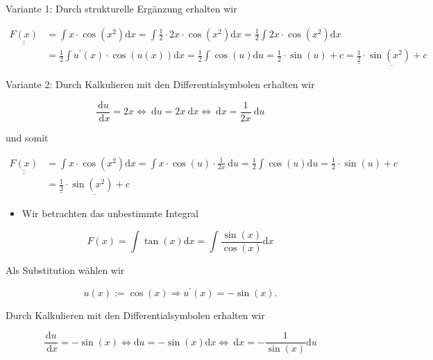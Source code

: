 \documentclass[10pt]{article}
\begin{document}
Variante 1: Durch strukturelle Ergänzung erhalten wir


\begin{align*}
\underline{\underline{F(x)}} & =\int x \cdot \cos \left(x^{2}\right) \mathrm{d} x=\int \frac{1}{2} \cdot 2 x \cdot \cos \left(x^{2}\right) \mathrm{d} x=\frac{1}{2} \int 2 x \cdot \cos \left(x^{2}\right) \mathrm{d} x \\
& =\frac{1}{2} \int u^{\prime}(x) \cdot \cos (u(x)) \mathrm{d} x=\frac{1}{2} \int \cos (u) \mathrm{d} u=\frac{1}{2} \cdot \sin (u)+c=\underline{\underline{\frac{1}{2}} \cdot \sin \left(x^{2}\right)+c} \tag{3.4}
\end{align*}


Variante 2: Durch Kalkulieren mit den Differentialsymbolen erhalten wir


\begin{equation*}
\frac{\mathrm{d} u}{\mathrm{~d} x}=2 x \Leftrightarrow \mathrm{~d} u=2 x \mathrm{~d} x \Leftrightarrow \mathrm{~d} x=\frac{1}{2 x} \mathrm{~d} u \tag{3.5}
\end{equation*}


und somit


\begin{align*}
\underline{\underline{F(x)}} & =\int x \cdot \cos \left(x^{2}\right) \mathrm{d} x=\int x \cdot \cos (u) \cdot \frac{1}{2 x} \mathrm{~d} u=\frac{1}{2} \int \cos (u) \mathrm{d} u=\frac{1}{2} \cdot \sin (u)+c \\
& =\underline{\underline{\frac{1}{2}} \cdot \sin \left(x^{2}\right)+c} \tag{3.6}
\end{align*}


\begin{itemize}
  \item Wir betrachten das unbestimmte Integral
\end{itemize}


\begin{equation*}
F(x)=\int \tan (x) \mathrm{d} x=\int \frac{\sin (x)}{\cos (x)} \mathrm{d} x \tag{3.7}
\end{equation*}


Als Substitution wählen wir


\begin{equation*}
u(x):=\cos (x) \Rightarrow u^{\prime}(x)=-\sin (x) . \tag{3.8}
\end{equation*}


Durch Kalkulieren mit den Differentialsymbolen erhalten wir


\begin{equation*}
\frac{\mathrm{d} u}{\mathrm{~d} x}=-\sin (x) \Leftrightarrow \mathrm{d} u=-\sin (x) \mathrm{d} x \Leftrightarrow \mathrm{~d} x=-\frac{1}{\sin (x)} \mathrm{d} u \tag{3.9}
\end{equation*}
\end{document}
